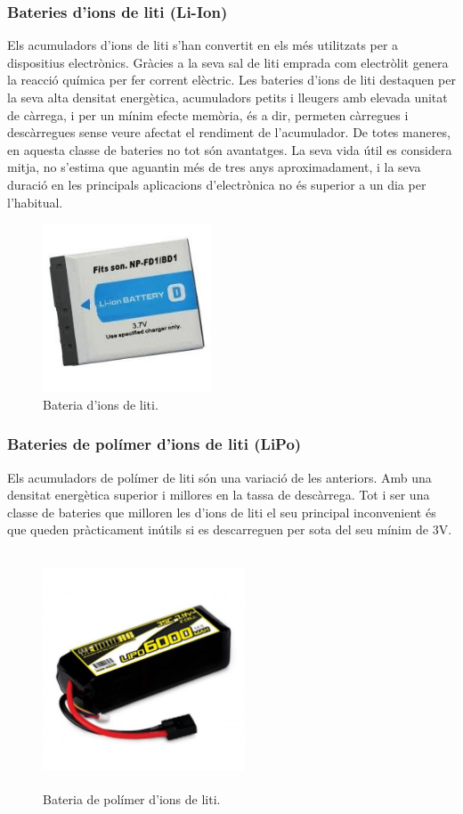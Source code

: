 \subsubsection{Bateries d'ions de liti (Li-Ion)}
Els acumuladors d'ions de liti s’han convertit en els més utilitzats per a dispositius electrònics. Gràcies a la seva sal de liti emprada com electròlit genera la reacció química per fer corrent elèctric. Les bateries d'ions de liti destaquen per la seva alta densitat energètica, acumuladors petits i lleugers amb elevada unitat de càrrega, i per un mínim efecte memòria, és a dir, permeten càrregues i descàrregues sense veure afectat el rendiment de l’acumulador. De totes maneres, en aquesta classe de bateries no tot són avantatges. La seva vida útil es considera mitja, no s’estima que aguantin més de tres anys aproximadament, i la seva duració en les principals aplicacions d'electrònica no és superior a un dia per l’habitual. 
\begin{figure}[H]
	\centering
    \includegraphics[width=5cm, height=5cm] {Bateries/Li-ion.jpg}
    \caption{Bateria d'ions de liti.}
\end{figure}

\subsubsection{Bateries de polímer d'ions de liti (LiPo)}
Els acumuladors de polímer de liti són una variació de les anteriors. Amb una densitat energètica superior i millores en la tassa de descàrrega. Tot i ser una classe de bateries que milloren les d'ions de liti el seu principal inconvenient és que queden pràcticament inútils si es descarreguen per sota del seu mínim de 3V.
\begin{figure}[H]
	\centering
    \includegraphics[width=6cm, height=7cm] {Bateries/lipo.jpg}
    \caption{Bateria de polímer d'ions de liti.}
\end{figure}

